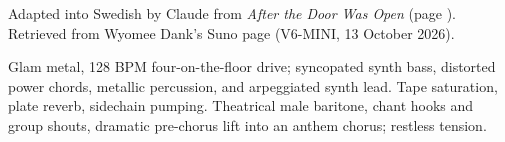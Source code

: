 
\begin{notes}
Adapted into Swedish by Claude from \emph{After the Door Was Open} (page \pageref{sec:after-the-door-was-open}). Retrieved from Wyomee Dank's Suno page (V6-MINI, 13 October 2026).
\end{notes}
\begin{style}
Glam metal, 128 BPM four-on-the-floor drive; syncopated synth bass, distorted power chords, metallic percussion, and arpeggiated synth lead. Tape saturation, plate reverb, sidechain pumping. Theatrical male baritone, chant hooks and group shouts, dramatic pre-chorus lift into an anthem chorus; restless tension.
\end{style}
